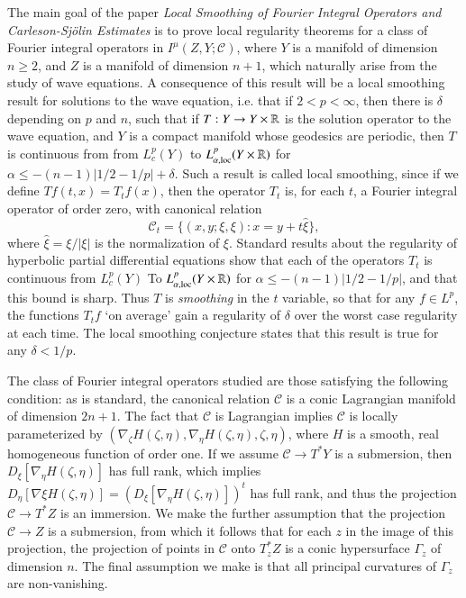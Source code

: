 The main goal of the paper \emph{Local Smoothing of Fourier Integral Operators and {C}arleson-{S}j\"{o}lin Estimates} is to prove local regularity theorems for a class of Fourier integral operators in $I^\mu(Z,Y;\mathcal{C})$, where $Y$ is a manifold of dimension $n \geq 2$, and $Z$ is a manifold of dimension $n+1$, which naturally arise from the study of wave equations. A consequence of this result will be a local smoothing result for solutions to the wave equation, i.e. that if $2 < p < \infty$, then there is $\delta$ depending on $p$ and $n$, such that if $T: Y \to Y \times \operatorname{\mathbb{R}}$ is the solution operator to the wave equation, and $Y$ is a compact manifold whose geodesics are periodic, then $T$ is continuous from from $L^p_c(Y)$ to $L^p_{\alpha,\text{loc}}(Y \times \operatorname{\mathbb{R}})$ for $\alpha \leq -(n-1)|1/2 - 1/p| + \delta$. Such a result is called local smoothing, since if we define $Tf(t,x) = T_tf(x)$, then the operator $T_t$ is, for each $t$, a Fourier integral operator of order zero, with canonical relation
%
\[ \mathcal{C}_t = \{ (x,y;\xi,\xi) : x = y + t \widehat{\xi} \}, \]
%
where $\widehat{\xi} = \xi / |\xi|$ is the normalization of $\xi$. Standard results about the regularity of hyperbolic partial differential equations show that each of the operators $T_t$ is continuous from $L^p_c(Y)$ To $L^p_{\alpha,\text{loc}}(Y \times \operatorname{\mathbb{R}})$ for $\alpha \leq -(n-1)|1/2 - 1/p|$, and that this bound is sharp. Thus $T$ is \emph{smoothing} in the $t$ variable, so that for any $f \in L^p$, the functions $T_t f$ `on average' gain a regularity of $\delta$ over the worst case regularity at each time. The local smoothing conjecture states that this result is true for any $\delta < 1/p$.

The class of Fourier integral operators studied are those satisfying the following condition: as is standard, the canonical relation $\mathcal{C}$ is a conic Lagrangian manifold of dimension $2n + 1$. The fact that $\mathcal{C}$ is Lagrangian implies $\mathcal{C}$ is locally parameterized by $(\nabla_\zeta H(\zeta, \eta), \nabla_\eta H(\zeta, \eta),\zeta,\eta)$, where $H$ is a smooth, real homogeneous function of order one. If we assume $\mathcal{C} \to T^* Y$ is a submersion, then $D_\xi [\nabla_\eta H(\zeta,\eta)]$ has full rank, which implies $D_\eta [\nabla \xi H(\zeta, \eta)] = (D_\xi [\nabla_\eta H(\zeta, \eta)])^t$ has full rank, and thus the projection $\mathcal{C} \to T^* Z$ is an immersion. We make the further assumption that the projection $\mathcal{C} \to Z$ is a submersion, from which it follows that for each $z$ in the image of this projection, the projection of points in $\mathcal{C}$ onto $T^*_z Z$ is a conic hypersurface $\Gamma_z$ of dimension $n$. The final assumption we make is that all principal curvatures of $\Gamma_z$ are non-vanishing.

